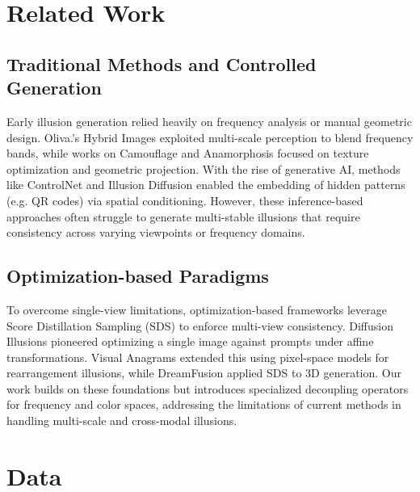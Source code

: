 \documentclass{article}
\begin{document}
\section{Related Work}
\label{related_work}

\subsection{Traditional Methods and Controlled Generation}

Early illusion generation relied heavily on frequency analysis or manual geometric design. Oliva\cite{10.1145/1141911.1141919}.'s Hybrid Images exploited multi-scale perception to blend frequency bands, while works on Camouflage and Anamorphosis \cite{chu2010camouflage} focused on texture optimization and geometric projection. With the rise of generative AI, methods like ControlNet\cite{zhao2023uni} and Illusion Diffusion\cite{10.1145/3641519.3657500} enabled the embedding of hidden patterns (e.g. QR codes) via spatial conditioning. However, these inference-based approaches often struggle to generate multi-stable illusions that require consistency across varying viewpoints or frequency domains.

\subsection{Optimization-based Paradigms}

To overcome single-view limitations, optimization-based frameworks leverage Score Distillation Sampling (SDS) to enforce multi-view consistency. Diffusion Illusions\cite{10.1145/3641519.3657500} pioneered optimizing a single image against prompts under affine transformations. Visual Anagrams\cite{geng2024visual} extended this using pixel-space models for rearrangement illusions, while DreamFusion\cite{poole2022dreamfusion} applied SDS to 3D generation. Our work builds on these foundations but introduces specialized decoupling operators for frequency and color spaces, addressing the limitations of current methods in handling multi-scale and cross-modal illusions.

\section{Data}
\label{data}
\end{document}
